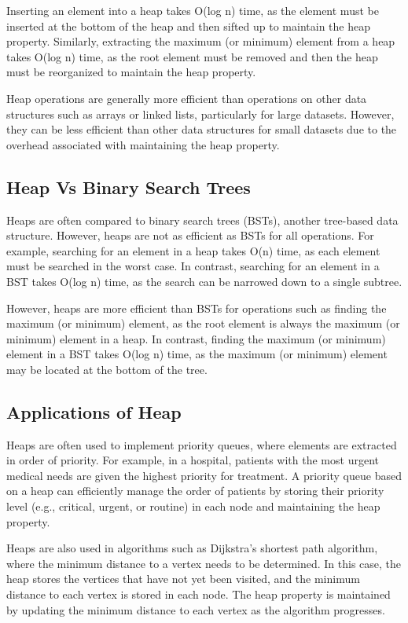 \documentclass[11pt]{article}
\begin{document}
Inserting an element into a heap takes O(log n) time, as the element must be inserted at the bottom of the heap and then sifted up to maintain the heap property. Similarly, extracting the maximum (or minimum) element from a heap takes O(log n) time, as the root element must be removed and then the heap must be reorganized to maintain the heap property.

Heap operations are generally more efficient than operations on other data structures such as arrays or linked lists, particularly for large datasets. However, they can be less efficient than other data structures for small datasets due to the overhead associated with maintaining the heap property.

\subsection{Heap Vs Binary Search Trees}

Heaps are often compared to binary search trees (BSTs), another tree-based data structure. However, heaps are not as efficient as BSTs for all operations. For example, searching for an element in a heap takes O(n) time, as each element must be searched in the worst case. In contrast, searching for an element in a BST takes O(log n) time, as the search can be narrowed down to a single subtree.

However, heaps are more efficient than BSTs for operations such as finding the maximum (or minimum) element, as the root element is always the maximum (or minimum) element in a heap. In contrast, finding the maximum (or minimum) element in a BST takes O(log n) time, as the maximum (or minimum) element may be located at the bottom of the tree.

\subsection{Applications of Heap}

Heaps are often used to implement priority queues, where elements are extracted in order of priority. For example, in a hospital, patients with the most urgent medical needs are given the highest priority for treatment. A priority queue based on a heap can efficiently manage the order of patients by storing their priority level (e.g., critical, urgent, or routine) in each node and maintaining the heap property.

Heaps are also used in algorithms such as Dijkstra's shortest path algorithm, where the minimum distance to a vertex needs to be determined. In this case, the heap stores the vertices that have not yet been visited, and the minimum distance to each vertex is stored in each node. The heap property is maintained by updating the minimum distance to each vertex as the algorithm progresses.
\end{document}
